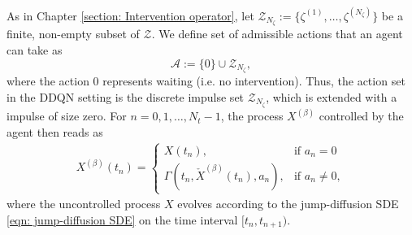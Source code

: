 As in Chapter \ref{section: Intervention operator}, let $\mathcal{Z}_{N_\zeta}:=\{\zeta^{(1)}, \ldots, \zeta^{(N_\zeta)}\}$ be a finite, non-empty subset of $\mathcal{Z}$. We define set of admissible actions that an agent can take as
\begin{equation*}
    \mathcal{A} := \{0\} \cup \mathcal{Z}_{N_\zeta},
\end{equation*}
where the action $0$ represents waiting (i.e. no intervention). Thus, the action set in the DDQN setting is the discrete impulse set $\mathcal{Z}_{N_\zeta}$, which is extended with a impulse of size zero. For $n=0, 1, \ldots, N_t-1$, the process $X^{(\beta)}$ controlled by the agent then reads as
\begin{align*}
    X^{(\beta)}(t_n) = 
    \begin{cases}
        X(t_n), & \text{if } a_n = 0 \\[2pt] 
        \Gamma(t_n, \check{X}^{(\beta)}(t_n), a_n), & \text{if } a_n \neq 0,
    \end{cases}
\end{align*}
where the uncontrolled process $X$ evolves according to the jump-diffusion SDE \eqref{eqn: jump-diffusion SDE} on the time interval $[t_n,t_{n+1})$. 

